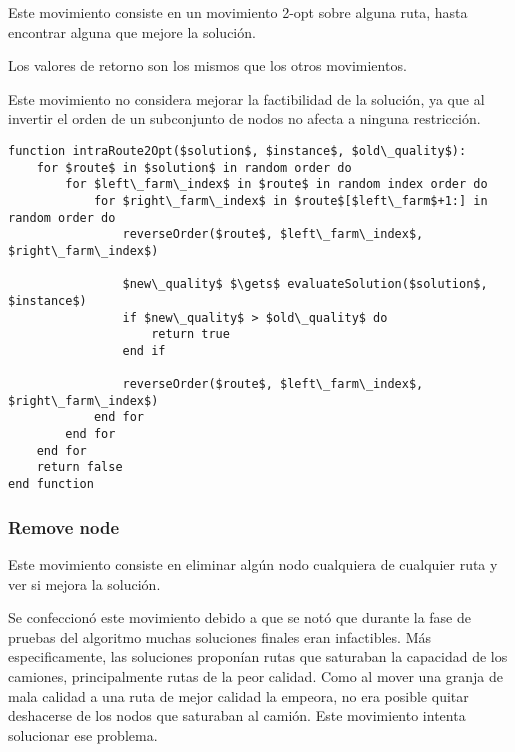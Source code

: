 Este movimiento consiste en un movimiento 2-opt sobre alguna ruta, hasta encontrar alguna que mejore la solución.

Los valores de retorno son los mismos que los otros movimientos.

Este movimiento no considera mejorar la factibilidad de la solución, ya que al invertir el orden de un subconjunto de nodos no afecta a ninguna restricción.

\begin{lstlisting}[style=estiloPseudocodigo]
function intraRoute2Opt($solution$, $instance$, $old\_quality$):
    for $route$ in $solution$ in random order do
        for $left\_farm\_index$ in $route$ in random index order do
            for $right\_farm\_index$ in $route$[$left\_farm$+1:] in random order do
                reverseOrder($route$, $left\_farm\_index$, $right\_farm\_index$)

                $new\_quality$ $\gets$ evaluateSolution($solution$, $instance$)
                if $new\_quality$ > $old\_quality$ do
                    return true
                end if

                reverseOrder($route$, $left\_farm\_index$, $right\_farm\_index$)
            end for
        end for
    end for
    return false
end function
\end{lstlisting}

\subsubsection{Remove node}

Este movimiento consiste en eliminar algún nodo cualquiera de cualquier ruta y ver si mejora la solución.

Se confeccionó este movimiento debido a que se notó que durante la fase de pruebas del algoritmo muchas soluciones finales eran infactibles. Más especificamente, las soluciones proponían rutas que saturaban la capacidad de los camiones, principalmente rutas de la peor calidad. Como al mover una granja de mala calidad a una ruta de mejor calidad la empeora, no era posible quitar deshacerse de los nodos que saturaban al camión. Este movimiento intenta solucionar ese problema.

